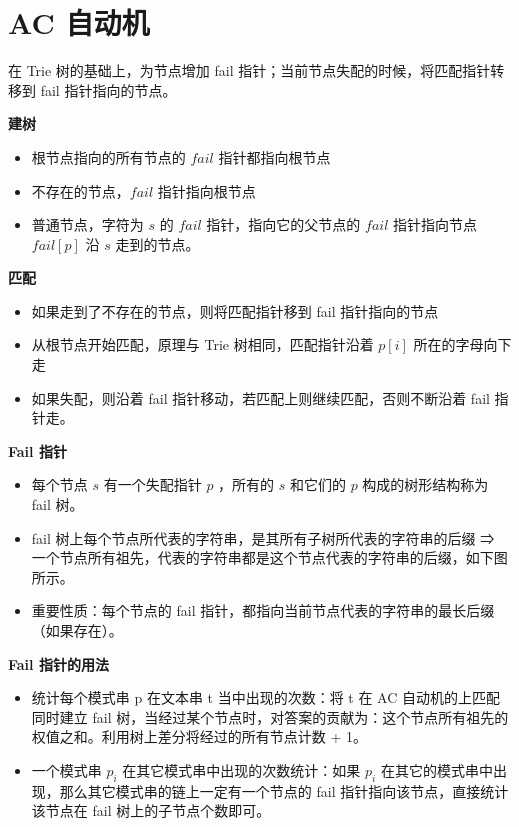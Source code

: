 \section{AC 自动机}

\par 在 Trie 树的基础上，为节点增加 fail 指针；当前节点失配的时候，将匹配指针转移到 fail 指针指向的节点。
\vspace{0.5em}

\par\textbf{建树}
\begin{itemize}
    \item 根节点指向的所有节点的 $fail$ 指针都指向根节点
    \item 不存在的节点，$fail$ 指针指向根节点
    \item 普通节点，字符为 $s$ 的 $fail$ 指针，指向它的父节点的 $fail$ 指针指向节点 $fail[p]$ 沿 $s$ 走到的节点。
\end{itemize}

\par\textbf{匹配}
\begin{itemize}
    \item 如果走到了不存在的节点，则将匹配指针移到 fail 指针指向的节点
    \item 从根节点开始匹配，原理与 Trie 树相同，匹配指针沿着 $p[i]$ 所在的字母向下走
    \item 如果失配，则沿着 fail 指针移动，若匹配上则继续匹配，否则不断沿着 fail 指针走。
\end{itemize}

\par\textbf{Fail 指针}
\begin{itemize}
    \item 每个节点 $s$ 有一个失配指针 $p$ ，所有的 $s$ 和它们的 $p$ 构成的树形结构称为 fail 树。
    \item fail 树上每个节点所代表的字符串，是其所有子树所代表的字符串的后缀 ⇒ 一个节点所有祖先，代表的字符串都是这个节点代表的字符串的后缀，如下图所示。
    \item 重要性质：每个节点的 fail 指针，都指向当前节点代表的字符串的最长后缀（如果存在）。
\end{itemize}

\par\textbf{Fail 指针的用法}
\begin{itemize}
    \item 统计每个模式串 p 在文本串 t 当中出现的次数：将 t 在 AC 自动机的上匹配同时建立 fail 树，当经过某个节点时，对答案的贡献为：这个节点所有祖先的权值之和。利用树上差分将经过的所有节点计数 + 1。
    \item 一个模式串 $p_i$ 在其它模式串中出现的次数统计：如果 $p_i$ 在其它的模式串中出现，那么其它模式串的链上一定有一个节点的 fail 指针指向该节点，直接统计该节点在 fail 树上的子节点个数即可。
\end{itemize}



